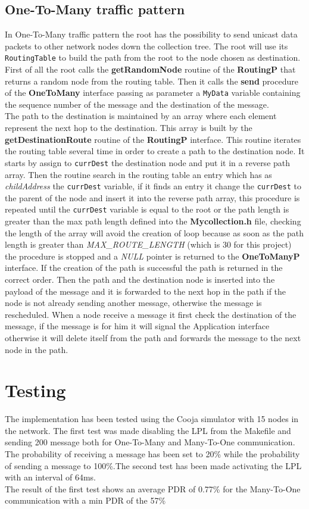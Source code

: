 \documentclass{article}
\begin{document}
    \subsection{One-To-Many traffic pattern}
In One-To-Many traffic pattern the root has the possibility to send unicast data packets to other network nodes down the collection tree. The root will use its \texttt{RoutingTable} to build the path from the root to the node chosen as destination. \\
First of all the root calls the \textbf{getRandomNode} routine of the \textbf{RoutingP} that returns a random node from the routing table. Then it calls the \textbf{send} procedure of the \textbf{OneToMany} interface passing as parameter a \texttt{MyData} variable containing the sequence number of the message and the destination of the message.\\
The path to the destination is maintained by an array where each element represent the next hop to the destination. This array is built by the \textbf{getDestinationRoute} routine of the \textbf{RoutingP} interface. This routine iterates the routing table several time in order to create a path to the destination node. It starts by assign to \texttt{currDest} the destination node and put it in a reverse path array. Then the routine search in the routing table an entry which has as \emph{childAddress} the \texttt{currDest} variable, if it finds an entry it change the \texttt{currDest} to the parent of the node and insert it into the reverse path array, this procedure is repeated until the \texttt{currDest} variable is equal to the root or the path length is greater than the max path length defined into the \textbf{Mycollection.h} file, checking the length of the array will avoid the creation of loop because as soon as the path length is  greater than \emph{MAX\_ROUTE\_LENGTH} (which is 30 for this project) the procedure is stopped and a \emph{NULL} pointer is returned to the \textbf{OneToManyP} interface. If the creation of the path is successful the path is returned in the correct order. Then the path and the destination node is inserted into the payload of the message and it is forwarded to the next hop in the path if the node is not already sending another message, otherwise the message is rescheduled. When a node receive a message it first check the destination of the message, if the message is for him it will signal the Application interface otherwise it will delete itself from the path and forwards the message to the next node in the path.
\section{Testing}
The implementation has been tested using the Cooja simulator with 15 nodes in the network. The first test was made disabling the LPL from the Makefile and sending 200 message both for One-To-Many and Many-To-One communication. The probability of receiving a message has been set to 20\% while the probability of sending a message to 100\%.The second test has been made activating the LPL with an interval of 64ms.\\

The result of the first test shows an average PDR of 0.77\% for the Many-To-One communication with a min PDR of the 57\%
\end{document}
